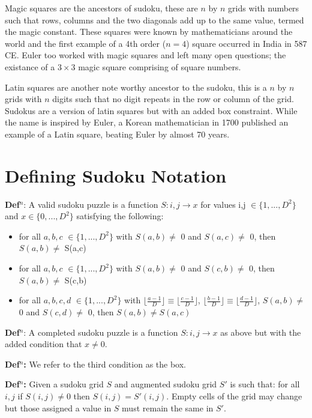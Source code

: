 \documentclass[a4paper,11pt]{report}
\newcounter{row}
\newcounter{col}
\begin{document}
Magic squares are the ancestors of sudoku, these are $n$ by $n$ grids with numbers such that rows, columns and the two diagonals add up to the same value, termed the magic constant. These squares were known by mathematicians around the world and the first example of a 4th order ($n=4$) square occurred in India in 587 CE. Euler too worked with magic squares and left many open questions; the existance of a $3\times 3$ magic square comprising of square numbers.

Latin squares are another note worthy ancestor to the sudoku, this is a $n$ by $n$ grids with $n$ digits such that no digit repeats in the row or column of the grid. Sudokus are a version of latin squares but with an added box constraint. While the name is inspired by Euler, a  Korean mathematician in 1700 published an example of a Latin square, beating Euler by almost 70 years. 
	
\section{Defining Sudoku Notation}
	
\textbf{Def$^n$}: A valid sudoku puzzle is a function $ S: i,j \rightarrow x$ for values i,j $\in \{1,...,D^2\}$ and $x \in\{0,...,D^2\}$ satisfying the following:
\begin{itemize}
	\item{for all $a,b,c$  $\in \{1,...,D^2\}$ with $S(a,b)\neq$ 0 and $S(a,c)\neq$ 0, then $ S(a,b)\neq$ S(a,c) }
	\item{for all $a,b,c$  $\in \{1,...,D^2\}$ with $S(a,b)\neq$ 0 and $S(c,b)\neq$ 0, then $S(a,b)\neq$ S(c,b) }
	\item{for all $ a,b,c,d $ $\in \{1,...,D^2\}$ with $\lfloor\frac{a-1}{D}\rfloor\equiv\lfloor\frac{c-1}{D}\rfloor$, $\lfloor\frac{b-1}{D}\rfloor\equiv\lfloor\frac{d-1}{D}\rfloor$, $S(a,b)\neq$ 0 and $S(c,d) \neq$ 0, then $S(a,b)\neq S(a,c)$ }
\end{itemize}

\textbf{Def$^n$}: A completed sudoku puzzle is a function $ S: i,j \rightarrow x$ as above but with the added condition that $x \neq 0$.

\textbf{Def$^n$:} We refer to the third condition as the box.

\textbf{Def$^n$:} Given a sudoku grid $S$ and augmented sudoku grid $S'$ is such that: for all $i,j$ if $S(i,j)\neq0$ then $S(i,j)=S'(i,j)$. Empty cells of the grid may change but those assigned a value in $S$ must remain the same in $S'$. 
\end{document}
